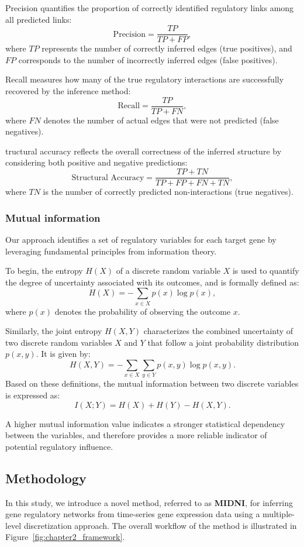 Precision quantifies the proportion of correctly identified regulatory links among all predicted links:
\[
\text{Precision} = \frac{TP}{TP + FP},
\]
where \( TP \) represents the number of correctly inferred edges (true positives), and \( FP \) corresponds to the number of incorrectly inferred edges (false positives).

Recall measures how many of the true regulatory interactions are successfully recovered by the inference method:
\[
\text{Recall} = \frac{TP}{TP + FN},
\]
where \( FN \) denotes the number of actual edges that were not predicted (false negatives).

tructural accuracy reflects the overall correctness of the inferred structure by considering both positive and negative predictions:
\[
\text{Structural Accuracy} = \frac{TP + TN}{TP + FP + FN + TN},
\]
where \( TN \) is the number of correctly predicted non-interactions (true negatives).



\subsubsection{Mutual information}
Our approach identifies a set of regulatory variables for each target gene by leveraging fundamental principles from information theory.

To begin, the entropy \( H(X) \) of a discrete random variable \( X \) is used to quantify the degree of uncertainty associated with its outcomes, and is formally defined as:
\[
H(X) = - \sum_{x \in X} p(x) \log p(x),
\]
where \( p(x) \) denotes the probability of observing the outcome \( x \).

Similarly, the joint entropy \( H(X,Y) \) characterizes the combined uncertainty of two discrete random variables \( X \) and \( Y \) that follow a joint probability distribution \( p(x,y) \). It is given by:
\[
H(X,Y) = - \sum_{x \in X} \sum_{y \in Y} p(x,y) \log p(x,y).
\]
Based on these definitions, the mutual information between two discrete variables is expressed as:
\[
I(X;Y) = H(X) + H(Y) - H(X,Y).
\]

A higher mutual information value indicates a stronger statistical dependency between the variables, and therefore provides a more reliable indicator of potential regulatory influence.

\subsection{Methodology}
In this study, we introduce a novel method, referred to as \textbf{MIDNI}, for inferring gene regulatory networks from time-series gene expression data using a multiple-level discretization approach. The overall workflow of the method is illustrated in Figure~\ref{fig:chapter2_framework}.

